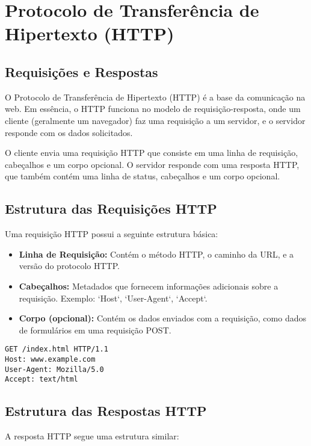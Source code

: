 \section{Protocolo de Transferência de Hipertexto (HTTP)}

\subsection{Requisições e Respostas}
O Protocolo de Transferência de Hipertexto (HTTP) é a base da comunicação na web. Em essência, o HTTP funciona no modelo de requisição-resposta, onde um cliente (geralmente um navegador) faz uma requisição a um servidor, e o servidor responde com os dados solicitados.

O cliente envia uma requisição HTTP que consiste em uma linha de requisição, cabeçalhos e um corpo opcional. O servidor responde com uma resposta HTTP, que também contém uma linha de status, cabeçalhos e um corpo opcional.


\subsection{Estrutura das Requisições HTTP}
Uma requisição HTTP possui a seguinte estrutura básica:

\begin{itemize}
    \item \textbf{Linha de Requisição:} Contém o método HTTP, o caminho da URL, e a versão do protocolo HTTP.
    \item \textbf{Cabeçalhos:} Metadados que fornecem informações adicionais sobre a requisição. Exemplo: `Host`, `User-Agent`, `Accept`.
    \item \textbf{Corpo (opcional):} Contém os dados enviados com a requisição, como dados de formulários em uma requisição POST.
\end{itemize}

\begin{verbatim}
GET /index.html HTTP/1.1
Host: www.example.com
User-Agent: Mozilla/5.0
Accept: text/html

\end{verbatim}

\subsection{Estrutura das Respostas HTTP}
A resposta HTTP segue uma estrutura similar:


